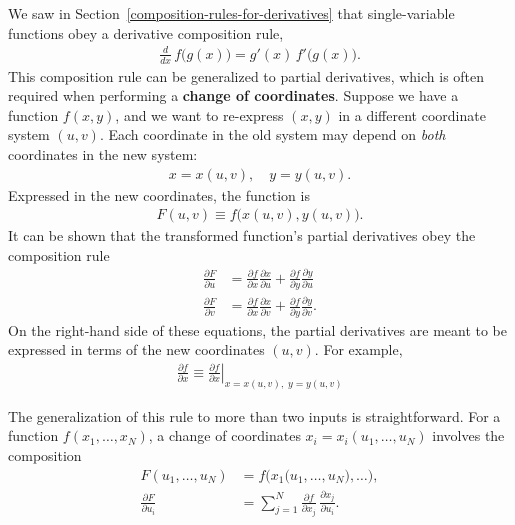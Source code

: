 \documentclass[10pt,a4paper]{article}
\begin{document}
We saw in Section~\ref{composition-rules-for-derivatives} that
single-variable functions obey a derivative composition rule,
\begin{align}
  \frac{d}{dx}\, f\big(g(x)\big) = g'(x) \, f'\big(g(x)\big).
\end{align}
This composition rule can be generalized to partial derivatives, which
is often required when performing a \textbf{change of
  coordinates}. Suppose we have a function $f(x,y)$, and we want to
re-express $(x, y)$ in a different coordinate system $(u, v)$. Each
coordinate in the old system may depend on \textit{both} coordinates
in the new system:
\begin{align}
  x = x(u,v), \quad y = y(u,v).
\end{align}
Expressed in the new coordinates, the function is
\begin{align}
  F(u,v) \equiv f\big(x(u,v), y(u,v)\big).
\end{align}
It can be shown that the transformed function's partial derivatives
obey the composition rule
\begin{align}
  \frac{\partial F}{\partial u} &= \frac{\partial f}{\partial x} \frac{\partial x}{\partial u} + \frac{\partial f}{\partial y} \frac{\partial y}{\partial u}\\
  \frac{\partial F}{\partial v} &= \frac{\partial f}{\partial x} \frac{\partial x}{\partial v} + \frac{\partial f}{\partial y} \frac{\partial y}{\partial v}.
\end{align}
On the right-hand side of these equations, the partial derivatives are
meant to be expressed in terms of the new coordinates $(u,v)$.  For
example,
\begin{align*}
  \frac{\partial f}{\partial x} \equiv \left.\frac{\partial f}{\partial x}\right|_{x = x(u,v), \;y= y(u,v)}
\end{align*}

The generalization of this rule to more than two inputs is
straightforward.  For a function $f(x_1, \dots, x_N)$, a change of
coordinates $x_i = x_i(u_1, \dots, u_N)$ involves the composition
\begin{align}
  F(u_1, \dots, u_N) &= f\big(x_1(u_1,\dots,u_N\big), \dots\big), \\
  \frac{\partial F}{\partial u_i} &= \sum_{j=1}^N \frac{\partial f}{\partial x_j}\, \frac{\partial x_j}{\partial u_i}.
\end{align}
\end{document}
